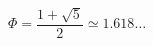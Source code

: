 \documentclass[preview]{standalone}
\begin{document}
\begin{align*}
\Phi = \dfrac{1 + \sqrt{5}}{2}\simeq 1.618\dots
\end{align*}
\end{document}
